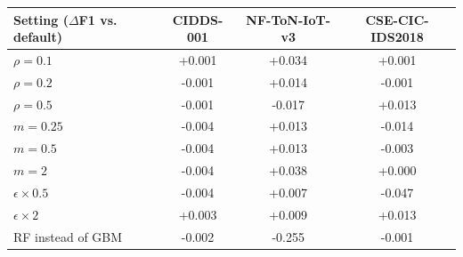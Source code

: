 \begin{tabular}{lccc}
\toprule
Setting ($\Delta$F1 vs. default) & CIDDS-001 & NF-ToN-IoT-v3 & CSE-CIC-IDS2018\\
\midrule
$\rho=0.1$ & +0.001 & +0.034 & +0.001\\
$\rho=0.2$ & -0.001 & +0.014 & -0.001\\
$\rho=0.5$ & -0.001 & -0.017 & +0.013\\
$m=0.25$ & -0.004 & +0.013 & -0.014\\
$m=0.5$ & -0.004 & +0.013 & -0.003\\
$m=2$ & -0.004 & +0.038 & +0.000\\
$\epsilon\times0.5$ & -0.004 & +0.007 & -0.047\\
$\epsilon\times2$ & +0.003 & +0.009 & +0.013\\
RF instead of GBM & -0.002 & -0.255 & -0.001\\
\bottomrule
\end{tabular}
